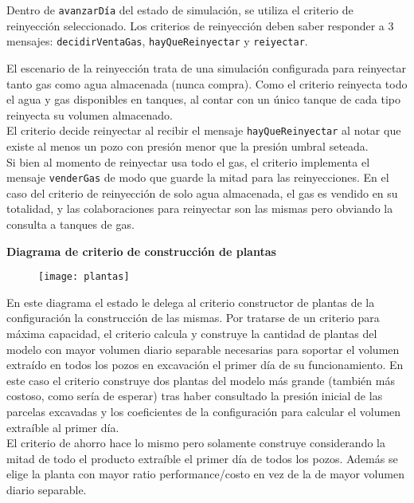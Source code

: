 Dentro de \texttt{avanzarDía} del estado de simulación, se utiliza el criterio de 
reinyección seleccionado. Los criterios de reinyección deben saber responder a 3 
mensajes: \texttt{decidirVentaGas}, \texttt{hayQueReinyectar} y 
\texttt{reiyectar}. 


El escenario de la reinyección trata de una simulación configurada para reinyectar tanto gas como agua almacenada (nunca compra). Como el criterio reinyecta todo el agua y gas disponibles en tanques, al contar con un único tanque de cada tipo reinyecta su volumen almacenado. 
\\

El criterio decide reinyectar al recibir el mensaje \texttt{hayQueReinyectar} al notar que existe al menos un pozo con presión menor que la presión umbral seteada.
\\

Si bien al momento de reinyectar usa todo el gas, el criterio implementa el mensaje \texttt{venderGas} de modo que guarde la mitad para las reinyecciones. En el caso del criterio de reinyección de solo agua almacenada, el gas es vendido en su totalidad, y las colaboraciones para reinyectar son las mismas pero obviando la consulta a tanques de gas. 


\newpage
\textbf{Diagrama de criterio de construcción de plantas}
\begin{figure}[H]
\centering
\texttt{[image: plantas]}
\end{figure}

En este diagrama el estado le delega al criterio constructor de plantas de la configuración la construcción de las mismas. Por tratarse de un criterio para máxima capacidad, el criterio calcula y construye la cantidad de plantas del modelo con mayor volumen diario separable necesarias para soportar el volumen extraído en todos los pozos en excavación el primer día de su funcionamiento. En este caso el criterio construye dos plantas del modelo más grande (también más costoso, como sería de esperar) tras haber consultado la presión inicial de las parcelas excavadas y los coeficientes de la configuración para calcular el volumen extraíble al primer día.
\\

El criterio de ahorro hace lo mismo pero solamente construye considerando la mitad de todo el producto extraíble el primer día de todos los pozos. Además se elige la planta con mayor ratio performance/costo en vez de la de mayor volumen diario separable.
\\

